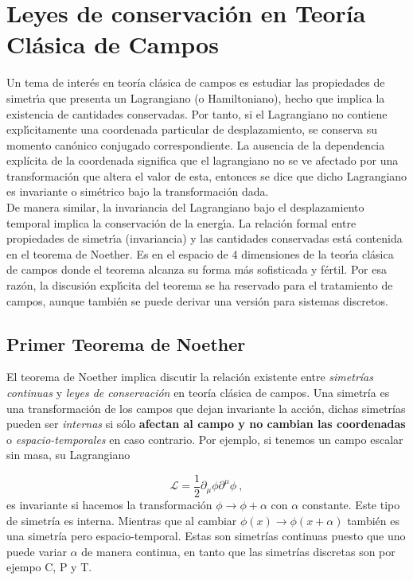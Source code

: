 \newpage
\section{Leyes de conservación en Teoría Clásica de Campos}
\vspace{0.2cm}

Un tema de interés en teoría clásica de campos es estudiar las propiedades de simetr\'{\i}a que presenta un Lagrangiano (o Hamiltoniano), hecho que implica la existencia de cantidades conservadas. Por tanto, si el Lagrangiano no contiene expl\'{\i}citamente una coordenada particular de desplazamiento, se conserva su momento can\'{o}nico conjugado correspondiente. La ausencia de la dependencia explícita de la coordenada significa que el lagrangiano no se ve afectado por una transformaci\'{o}n que altera el valor de esta, entonces se dice que dicho Lagrangiano es invariante o sim\'{e}trico bajo la transformaci\'{o}n dada.\\

De manera similar, la invariancia del Lagrangiano bajo el desplazamiento temporal implica la conservaci\'{o}n de la energ\'{\i}a. La relaci\'{o}n formal entre propiedades de simetr\'{\i}a (invariancia) y las cantidades conservadas est\'{a} contenida en el teorema de Noether. Es en el espacio de 4 dimensiones de la teor\'{\i}a cl\'{a}sica de campos donde el teorema alcanza su forma m\'{a}s sofisticada y f\'{e}rtil. Por esa raz\'{o}n, la discusi\'{o}n expl\'{\i}cita del teorema se ha reservado para el tratamiento de campos, aunque tambi\'{e}n se puede derivar una versi\'{o}n para sistemas discretos.

\subsection{Primer Teorema de Noether}  \label{seccion: Primer teorema de Noether}
\vspace{0.2cm}

El teorema de Noether implica discutir la relación existente entre \emph{simetrías continuas} y \emph{leyes de conservación} en teoría clásica de campos. Una simetría es una transformación de los campos que dejan invariante la acción, dichas simetrías pueden ser \emph{internas} si sólo \textbf{afectan al campo y no cambian las coordenadas} o \emph{espacio-temporales} en caso contrario. Por ejemplo, si tenemos un campo escalar sin masa, su Lagrangiano

\begin{equation}
    \mathcal{L}=\frac{1}{2}\partial_{\mu}\phi \partial^{\mu}\phi~,
\end{equation}
es invariante si hacemos la transformación $\phi \rightarrow \phi+\alpha$ con $\alpha$ constante. Este tipo de simetría es interna. Mientras que al cambiar $\phi(x)\rightarrow\phi(x+\alpha)$ también es una simetría pero espacio-temporal. Estas son simetrías continuas puesto que uno puede variar $\alpha$ de manera continua, en tanto que las simetrías discretas son por ejempo C, P y T.\\

